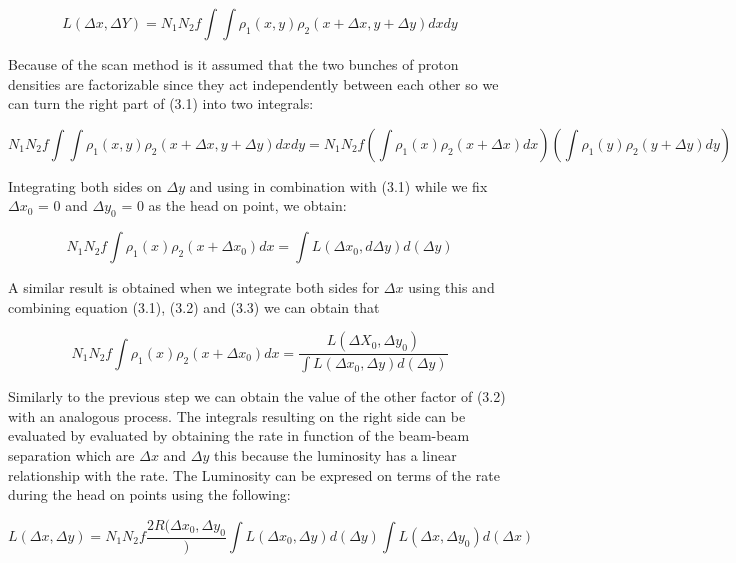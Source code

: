 \begin{equation}
 L(\Delta x, \Delta Y) = N_{1} N_{2} f  \int \int \rho_{1}(x,y)\rho_{2}(x+\Delta x, y+\Delta y) dxdy 
\end{equation}

Because of the scan method is it assumed that the two bunches of proton densities are factorizable since they act independently between each other so we can turn the right part of (3.1) into two integrals:

 \begin{equation}
N_{1} N_{2} f  \int \int \rho_{1}(x,y)\rho_{2}(x+\Delta x, y+\Delta y) dxdy   = N_{1} N_{2} f (\int \rho_{1}(x)\rho_{2}(x + \Delta x) dx) (\int \rho_{1}(y) \rho_{2}(y + \Delta y) dy)
\end{equation}

Integrating both sides on $\Delta y$ and using in combination with (3.1) while we fix $\Delta x_{0}$ = 0 and $\Delta y_{0}$ = 0 as the head on point,  we obtain:
 
 \begin{equation}
N_{1} N_{2} f \int \rho_{1}(x) \rho_{2}(x + \Delta x_{0}) dx = \int L (\Delta x_{0}, d\Delta y) d(\Delta y)
\end{equation}

A similar result is obtained when we integrate both sides for $\Delta x$ using this and combining equation (3.1), (3.2) and (3.3) we can obtain that 

\begin{equation}
N_{1} N_{2} f \int \rho_{1}(x) \rho_{2}(x + \Delta x_{0}) dx = \frac{L (\Delta X_{0}, \Delta y_{0})}{\int L(\Delta x_{0}, \Delta y) d(\Delta y)}
\end{equation}

Similarly to the previous step we can obtain the value of the other factor of (3.2) with an analogous process. The integrals resulting on the right side can be evaluated by evaluated by obtaining the rate in function of the beam-beam separation which are $\Delta x$ and $\Delta y$  this because the luminosity has a linear relationship with the rate. The Luminosity can be expresed on terms of the rate during the head on points using the following:

\begin{equation}
L(\Delta x, \Delta y) = N_{1} N_{2} f \frac{2R(\Delta x_{0}, \Delta y_{0}}){\int L(\Delta x_{0}, \Delta y) d(\Delta y) \int L(\Delta x, \Delta y_{0}) d(\Delta x)}
\end{equation}

